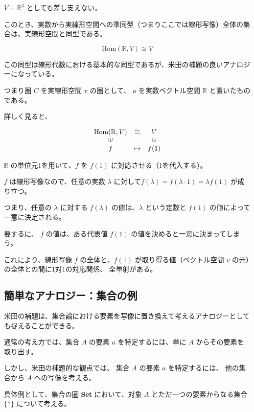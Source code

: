 \documentclass[uplatex,a4j,12pt,dvipdfmx]{jsarticle}
\begin{document}
$V=\mathbb{R}^{3}$ としても差し支えない。

このとき、実数から実線形空間への準同型（つまりここでは線形写像）全体の集合は、実線形空間と同型である。

\[
	\text{Hom}(\mathbb{R},V) \cong V
\]

この同型は線形代数における基本的な同型であるが、米田の補題の良いアナロジーになっている。

つまり圏 $C$ を実線形空間 $v$ の圏として、
$a$ を実数ベクトル空間 $\mathbb{R}$ と置いたものである。


詳しく見ると、

\[
	\begin{array}{ccc}
		\text{Hom}(\mathbb{R},V) & \cong   & V                       \\
		\rotatebox{90}{${\in}$}  &         & \rotatebox{90}{${\in}$} \\
		f                        & \mapsto & f(1)
	\end{array}
\]

$\mathbb{R}$ の単位元1を用いて、$f$ を $f(1)$ に対応させる（1を代入する）。

$f$ は線形写像なので、任意の実数 $\lambda$ に対して$f(\lambda) = f(\lambda \cdot 1) = \lambda f(1)$ が成り立つ。

つまり、任意の $\lambda$ に対する $f(\lambda)$ の値は、$\lambda$ という定数と $f(1)$ の値によって一意に決定される。

要するに、 $f$ の値は、ある代表値 $f(1)$ の値を決めると一意に決まってしまう。

これにより、線形写像 $f$ の全体と、$f(1)$ が取り得る値（ベクトル空間 $v$ の元）の全体との間に1対1の対応関係、
全単射がある。





\subsection{簡単なアナロジー：集合の例}

米田の補題は、集合論における要素を写像に置き換えて考えるアナロジーとしても捉えることができる。

通常の考え方では、集合 $A$ の要素 $a$ を特定するには、単に $A$ からその要素を取り出す。

しかし、米田の補題的な観点では、
集合 $A$ の要素 $a$ を特定するには、
他の集合から $A$ への写像を考える。


具体例として、集合の圏 \textbf{Set} において、対象 $A$ とただ一つの要素からなる集合 $\{*\}$ について考える。
\end{document}
